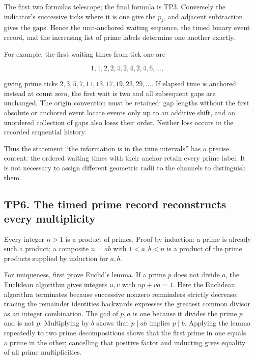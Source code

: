 \documentclass[
]{article}
\begin{document}
The first two formulas telescope; the final formula is TP3. Conversely
the indicator's successive ticks where it is one give the \(p_j\), and
adjacent subtraction gives the gaps. Hence the unit-anchored waiting
sequence, the timed binary event record, and the increasing list of
prime labels determine one another exactly.

For example, the first waiting times from tick one are

\[
1,1,2,2,4,2,4,2,4,6,\ldots,
\]

giving prime ticks \(2,3,5,7,11,13,17,19,23,29,\ldots\). If elapsed time
is anchored instead at count zero, the first wait is two and all
subsequent gaps are unchanged. The origin convention must be retained:
gap lengths without the first absolute or anchored event locate events
only up to an additive shift, and an unordered collection of gaps also
loses their order. Neither loss occurs in the recorded sequential
history.

Thus the statement ``the information is in the time intervals'' has a
precise content: the ordered waiting times with their anchor retain
every prime label. It is not necessary to assign different geometric
radii to the channels to distinguish them.

\subsection{TP6. The timed prime record reconstructs every
multiplicity}\label{tp6.-the-timed-prime-record-reconstructs-every-multiplicity}

Every integer \(n>1\) is a product of primes. Proof by induction: a
prime is already such a product; a composite \(n=ab\) with \(1<a,b<n\)
is a product of the prime products supplied by induction for \(a,b\).

For uniqueness, first prove Euclid's lemma. If a prime \(p\) does not
divide \(a\), the Euclidean algorithm gives integers \(u,v\) with
\(up+va=1\). Here the Euclidean algorithm terminates because successive
nonzero remainders strictly decrease; tracing the remainder identities
backwards expresses the greatest common divisor as an integer
combination. The gcd of \(p,a\) is one because it divides the prime
\(p\) and is not \(p\). Multiplying by \(b\) shows that \(p\mid ab\)
implies \(p\mid b\). Applying the lemma repeatedly to two prime
decompositions shows that the first prime in one equals a prime in the
other; cancelling that positive factor and inducting gives equality of
all prime multiplicities.
\end{document}
